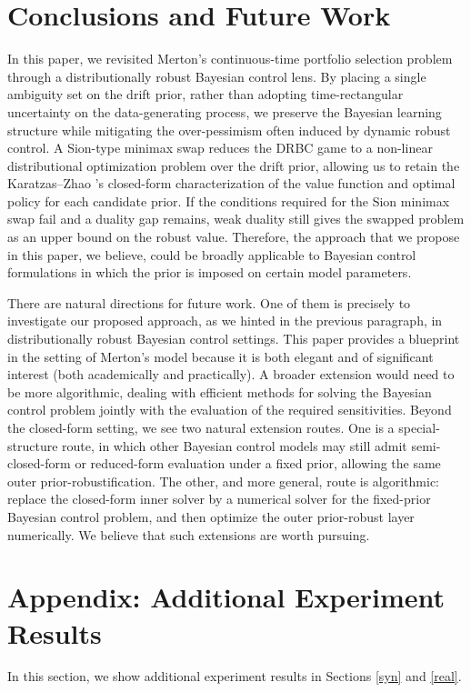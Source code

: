 \documentclass[11pt]{article}
\theoremstyle{definition}
\begin{document}
\section{Conclusions and Future Work}
In this paper, we revisited Merton's continuous-time portfolio selection problem through a distributionally robust Bayesian control lens. 
By placing a single ambiguity set on the drift prior, rather than adopting time-rectangular uncertainty on the data-generating process, we preserve the Bayesian learning structure while mitigating the over-pessimism often induced by dynamic robust control.
A Sion-type minimax swap reduces the DRBC game to a non-linear distributional optimization problem over the drift prior, allowing us to retain the Karatzas--Zhao \cite{KZ98}'s closed-form characterization of the value function and optimal policy for each candidate prior. {If the conditions required for the Sion minimax swap fail and a duality gap remains, weak
duality still gives the swapped problem as an upper bound on the robust value.} %
Therefore, the approach that we propose in this paper, we believe, could be broadly applicable to Bayesian control formulations in which the prior is imposed on certain model parameters. 

There are natural directions for future work. One of them is precisely to investigate our proposed approach, as we hinted in the previous paragraph, in distributionally robust Bayesian control settings. This paper provides a blueprint in the setting of Merton's model because it is both elegant and of significant interest (both academically and practically). A broader extension would need to be more algorithmic, dealing with efficient methods for solving the Bayesian control problem jointly with the evaluation of the required sensitivities. {Beyond the closed-form setting, we see two natural extension routes. One is a special-structure route, in which other Bayesian control models may still admit semi-closed-form or reduced-form evaluation under a fixed prior, allowing the same outer prior-robustification. The other, and more general, route is algorithmic: replace the closed-form inner solver by a numerical solver for the fixed-prior Bayesian control problem, and then optimize the outer prior-robust layer numerically.} We believe that such extensions are worth pursuing. 


\section{Appendix: Additional Experiment Results}
In this section, we show additional experiment results in Sections \ref{syn} and \ref{real}.
\end{document}
